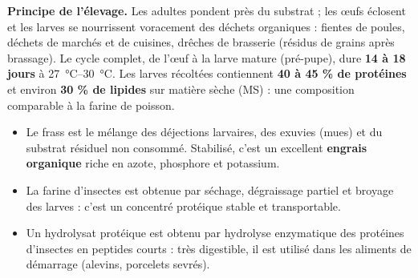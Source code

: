 \documentclass[11pt]{article}
\newcommand{\cle}[1]{{\popxbold\color{popdark}#1}}
\begin{document}
\textbf{Principe de l'élevage.} Les adultes pondent près du substrat ; les œufs éclosent et les larves se nourrissent voracement des déchets organiques : fientes de poules, déchets de marchés et de cuisines, drêches de brasserie (résidus de grains après brassage). Le cycle complet, de l'œuf à la larve mature (pré-pupe), dure \textbf{14 à 18 jours} à \SIrange{27}{30}{\celsius}. Les larves récoltées contiennent \textbf{40 à 45 \% de protéines} et environ \textbf{30 \% de lipides} sur matière sèche (MS) : une composition comparable à la farine de poisson.

\begin{definition}
\begin{itemize}
\item Le \cle{frass} est le mélange des déjections larvaires, des exuvies (mues) et du substrat résiduel non consommé. Stabilisé, c'est un excellent \textbf{engrais organique} riche en azote, phosphore et potassium.
\item La \cle{farine d'insectes} est obtenue par séchage, dégraissage partiel et broyage des larves : c'est un concentré protéique stable et transportable.
\item Un \cle{hydrolysat protéique} est obtenu par hydrolyse enzymatique des protéines d'insectes en peptides courts : très digestible, il est utilisé dans les aliments de démarrage (alevins, porcelets sevrés).
\end{itemize}
\end{definition}
\end{document}
